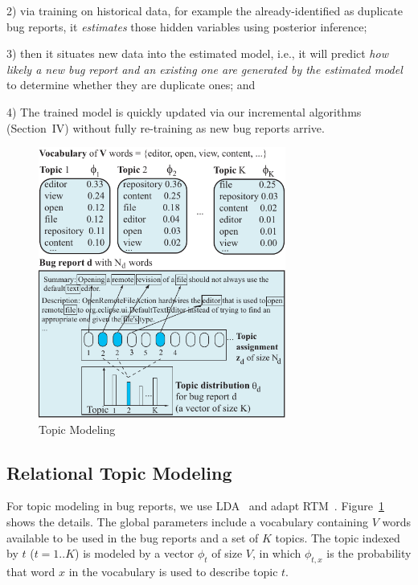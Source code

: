 2) via training on historical data, for example the already-identified
   as duplicate bug reports, it {\em estimates} those hidden variables
   using posterior inference;

3) then it situates new data into the estimated model, i.e., it will
   predict {\em how likely a new bug report and an existing one are
   generated by the estimated model} to determine whether they are
   duplicate ones; and

4) The trained model is quickly updated via our incremental algorithms
   (Section~IV) without fully re-training as new bug reports arrive.



\begin{figure}[t]
\centering
\includegraphics[width=3.2in]{illustration2}
\caption{Topic Modeling~\cite{lda}}
\label{topicmodel}
\end{figure}


\subsection{Relational Topic Modeling}

For topic modeling in bug reports, we use LDA~\cite{lda} and adapt
RTM~\cite{RTM}. Figure~\ref{topicmodel} shows the details.  The global
parameters include a vocabulary containing $V$ words available to be
used in the bug reports and a set of $K$ topics. The topic indexed by
$t$ ($t=1..K$) is modeled by a vector $\phi_t$ of size $V$, in which
$\phi_{t,x}$ is the probability that word $x$ in the vocabulary is
used to describe topic $t$.

